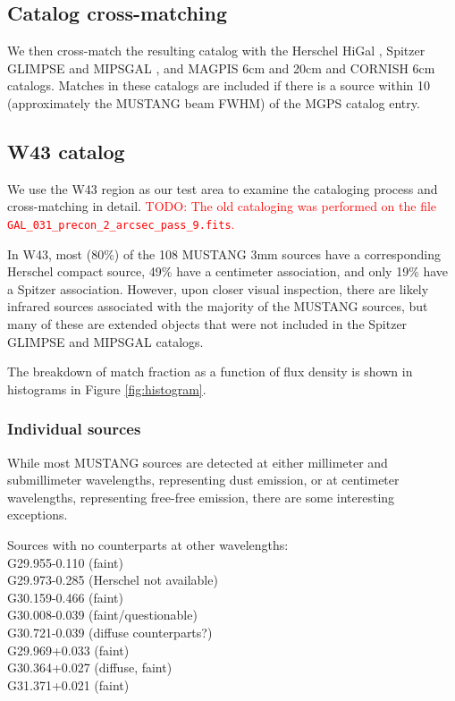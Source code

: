 \documentclass[twocolumn]{aastex62}
\def\todo#1{{\textcolor{red}{TODO: #1}}}
\begin{document}

\subsection{Catalog cross-matching}
\label{sec:catalogmatching}
We then cross-match the resulting catalog with the Herschel HiGal
\citep{Elia2017a}, Spitzer GLIMPSE and MIPSGAL
\citep{Churchwell2009a,Gutermuth2015a}, and MAGPIS 6cm and 20cm
\citep{Giveon2005a,Hoare2006a} and CORNISH 6cm \citep{Hoare2012a} catalogs.
Matches in these catalogs are included if there is a source within 10\arcsec
(approximately the MUSTANG beam FWHM) of the MGPS catalog entry.

\subsection{W43 catalog}
We use the W43 region as our test area to examine the cataloging process and
cross-matching in detail.
\todo{The old cataloging was performed on the file
\texttt{GAL\_031\_precon\_2\_arcsec\_pass\_9.fits}.}

In W43, most (80\%) of the 108 MUSTANG 3mm sources have a corresponding Herschel
compact source, 49\% have a centimeter association, and only 19\% have a
Spitzer association.  However, upon closer visual inspection, there are likely
infrared sources associated with the majority of the MUSTANG sources, but many
of these are extended objects that were not included in the Spitzer GLIMPSE and
MIPSGAL catalogs.

The breakdown of match fraction as a function of flux density is shown in histograms
in Figure \ref{fig:histogram}.

\subsubsection{Individual sources}
While most MUSTANG sources are detected at either millimeter and submillimeter
wavelengths, representing dust emission, or at centimeter wavelengths,
representing free-free emission, there are some interesting exceptions.

Sources with no counterparts at other wavelengths: \\
G29.955-0.110 (faint) \\
G29.973-0.285 (Herschel not available) \\
G30.159-0.466 (faint) \\
G30.008-0.039 (faint/questionable) \\
G30.721-0.039 (diffuse counterparts?) \\
G29.969+0.033 (faint) \\
G30.364+0.027 (diffuse, faint)\\
G31.371+0.021 (faint) \\
\end{document}
